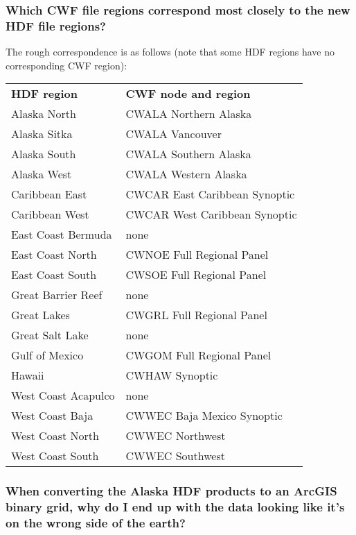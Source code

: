 \subsubsection*{Which CWF file regions correspond most closely to the new HDF file regions?}

The rough correspondence is as follows (note that some HDF regions
have no corresponding CWF region):

\begin{tabular}{ll}
{\bf HDF region} & {\bf CWF node and region} \\

Alaska North & CWALA Northern Alaska \\
Alaska Sitka & CWALA Vancouver \\
Alaska South & CWALA Southern Alaska \\
Alaska West & CWALA Western Alaska \\
Caribbean East & CWCAR East Caribbean Synoptic \\
Caribbean West & CWCAR West Caribbean Synoptic \\
East Coast Bermuda & none \\
East Coast North & CWNOE Full Regional Panel \\
East Coast South & CWSOE Full Regional Panel \\
Great Barrier Reef & none \\
Great Lakes & CWGRL Full Regional Panel \\
Great Salt Lake & none \\
Gulf of Mexico & CWGOM Full Regional Panel \\
Hawaii & CWHAW Synoptic \\
West Coast Acapulco & none \\
West Coast Baja & CWWEC Baja Mexico Synoptic \\
West Coast North & CWWEC Northwest \\
West Coast South & CWWEC Southwest

\end{tabular}

\subsubsection*{When converting the Alaska HDF products to an ArcGIS binary grid, why do I end up with the data looking like it's on the wrong side of the earth?}

